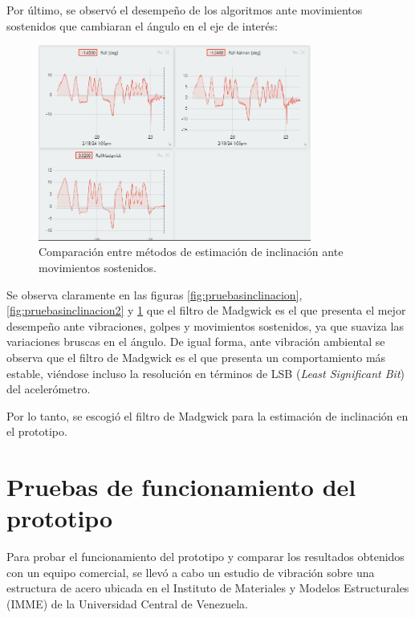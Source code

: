 Por último, se observó el desempeño de los algoritmos ante movimientos sostenidos que cambiaran el ángulo en el eje de interés:

\begin{figure}[H]
    \centering
    \includegraphics[width = 0.8\textwidth]{imagenes/cap3_resultados/Pruebas ACL/Inclinacion/Comparacion M1 M2 M3 (Maggwick) ante movimiento aleatorios.png}
    \caption{Comparación entre métodos de estimación de inclinación ante movimientos sostenidos.}
    \label{fig:pruebasinclinacion3}
\end{figure}

Se observa claramente en las figuras \ref{fig:pruebasinclinacion}, \ref{fig:pruebasinclinacion2} y \ref{fig:pruebasinclinacion3} que el filtro de Madgwick es el que presenta el mejor desempeño ante vibraciones, golpes y movimientos sostenidos, ya que suaviza las variaciones bruscas en el ángulo. De igual forma, ante vibración ambiental se observa que el filtro de Madgwick es el que presenta un comportamiento más estable, viéndose incluso la resolución en términos de LSB (\textit{Least Significant Bit}) del acelerómetro.

Por lo tanto, se escogió el filtro de Madgwick para la estimación de inclinación en el prototipo.

\section{Pruebas de funcionamiento del prototipo}

Para probar el funcionamiento del prototipo y comparar los resultados obtenidos con un equipo comercial, se llevó a cabo un estudio de vibración sobre una estructura de acero ubicada en el Instituto de Materiales y Modelos Estructurales (IMME) de la Universidad Central de Venezuela. 

